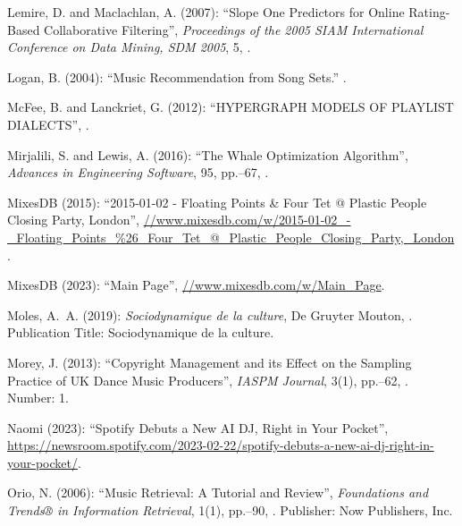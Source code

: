 \documentclass[11pt,titlepage,oneside]{book}
\begin{document}
\begin{thebibliography}{97}
	Lemire, D. and Maclachlan, A. (2007): \enquote{Slope {One} {Predictors} for
		{Online} {Rating}-{Based} {Collaborative} {Filtering}}, \textit{Proceedings
		of the 2005 SIAM International Conference on Data Mining, SDM 2005}, 5,
	.
	
	Logan, B. (2004): \enquote{Music {Recommendation} from {Song} {Sets}.} .
	
	McFee, B. and Lanckriet, G. (2012): \enquote{{HYPERGRAPH} {MODELS} {OF}
		{PLAYLIST} {DIALECTS}}, .
	
	Mirjalili, S. and Lewis, A. (2016): \enquote{The {Whale} {Optimization}
		{Algorithm}}, \textit{Advances in Engineering Software}, 95, pp.--67, .
	
	MixesDB (2015): \enquote{2015-01-02 - {Floating} {Points} \& {Four} {Tet} @
		{Plastic} {People} {Closing} {Party}, {London}},
	\urlprefix\url{//www.mixesdb.com/w/2015-01-02_-_Floating_Points_%26_Four_Tet_@_Plastic_People_Closing_Party,_London}.
	
	MixesDB (2023): \enquote{Main {Page}},
	\urlprefix\url{//www.mixesdb.com/w/Main_Page}.
	
	Moles, A.~A. (2019): \textit{Sociodynamique de la culture}, De Gruyter Mouton,
	. Publication Title: Sociodynamique de la culture.
	
	Morey, J. (2013): \enquote{Copyright {Management} and its {Effect} on the
		{Sampling} {Practice} of {UK} {Dance} {Music} {Producers}}, \textit{IASPM
		Journal}, 3(1), pp.--62, . Number: 1.
	
	Naomi (2023): \enquote{Spotify {Debuts} a {New} {AI} {DJ}, {Right} in {Your}
		{Pocket}},
	\urlprefix\url{https://newsroom.spotify.com/2023-02-22/spotify-debuts-a-new-ai-dj-right-in-your-pocket/}.
	
	Orio, N. (2006): \enquote{Music {Retrieval}: {A} {Tutorial} and {Review}},
	\textit{Foundations and Trends® in Information Retrieval}, 1(1),
	pp.--90, . Publisher: Now Publishers,
	Inc.
	

\end{thebibliography}
\end{document}
